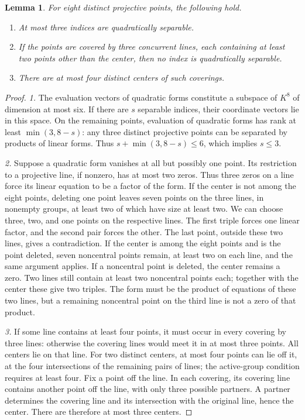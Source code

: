 \documentclass[11pt,a4paper]{article}
\numberwithin{equation}{section}
\theoremstyle{plain}
\newtheorem{lemma}[theorem]{Lemma}
\theoremstyle{definition}
\newcommand{\leqs}{\leqslant}\newcommand{\geqs}{\geqslant}
\begin{document}
\begin{lemma}\label{lem:projective-count}
For eight distinct projective points, the following hold.
\begin{enumerate}
\item At most three indices are quadratically separable.
\item If the points are covered by three concurrent lines, each
containing at least two points other than the center, then no index
is quadratically separable.
\item There are at most four distinct centers of such coverings.
\end{enumerate}
\end{lemma}
\begin{proof}
\emph{1.} The evaluation vectors of quadratic forms constitute a
subspace of $K^8$ of dimension at most six. If there are $s$ separable
indices, their coordinate vectors lie in this space. On the remaining
points, evaluation of quadratic forms has rank at least
$\min(3,8-s)$: any three distinct projective points can be separated
by products of linear forms. Thus $s+\min(3,8-s)\leqs6$, which implies
$s\leqs3$.

\emph{2.} Suppose a quadratic form vanishes at all but possibly one
point. Its restriction to a projective line, if nonzero, has at most
two zeros. Thus three zeros on a line force its linear equation to
be a factor of the form.
If the center is not among the eight points, deleting one point
leaves seven points on the three lines, in nonempty groups, at least
two of which have size at least two. We can choose three, two, and
one points on the respective lines. The first triple forces one
linear factor, and the second pair forces the other. The last point,
outside these two lines, gives a contradiction.
If the center is among the eight points and is the point deleted,
seven noncentral points remain, at least two on each line, and the
same argument applies. If a noncentral point is deleted, the center
remains a zero. Two lines still contain at least two noncentral points
each; together with the center these give two triples. The form must
be the product of equations of these two lines, but a remaining
noncentral point on the third line is not a zero of that product.

\emph{3.} If some line contains at least four points, it must occur
in every covering by three lines: otherwise the covering lines
would meet it in at most three points. All centers lie on that line.
For two distinct centers, at most four points can lie off it, at the
four intersections of the remaining pairs of lines; the active-group
condition requires at least four.
Fix a point off the line. In each covering, its covering line contains
another point off the line, with only three possible partners.
A partner determines the covering line and its intersection with the
original line, hence the center. There are therefore at most three centers.


\end{proof}
\end{document}
